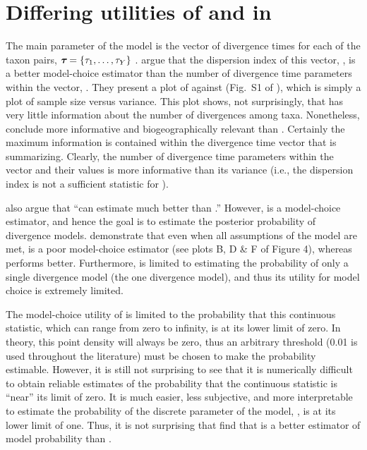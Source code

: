 \section*{Differing utilities of \numt{} and \vmratio{} in \msb}
The main parameter of the \msb model is the vector of divergence
times for each of the taxon pairs,
$\boldsymbol{\tau_{}} = \{\tau_{1}, \ldots, \tau_{Y}\}$
\citep{Oaks2012}.
\citet{Hickerson2013} argue that the dispersion index of this vector,
\vmratio{}, is a better model-choice estimator than the number of 
divergence time parameters within the vector,
\numt{}.
They present a plot of \numt{} against \vmratio{} (Fig.~S1 of
\citet{Hickerson2013}), which is simply a plot of sample size versus variance.
This plot shows, not surprisingly, that \vmratio{} has very little information
about the number of divergences among taxa.
Nonetheless, \citet{Hickerson2013} conclude \vmratio{} more informative and
biogeographically relevant than \numt{}.
Certainly the maximum information is contained within the divergence time
vector that \vmratio{} is summarizing.
Clearly, the number of divergence time parameters within the vector and their
values is more informative than its variance (i.e., the dispersion index is not
a sufficient statistic for \divtvector).

\citet{Hickerson2013} also argue that ``\msb can estimate \vmratio{} much
better than \numt{}.''
However, \msb is a model-choice estimator, and hence the goal is to estimate the
posterior probability of divergence models.
\citet{Oaks2012} demonstrate that even when all assumptions of the model are
met, \vmratio is a poor model-choice estimator (see plots B, D \& F of Figure
4), whereas \numt{} performs better.
Furthermore, \vmratio{} is limited to estimating the probability of only a
single divergence model (the one divergence model), and thus its utility for
model choice is extremely limited.

The model-choice utility of \vmratio{} is limited to the probability that
this continuous statistic, which can range from zero to infinity, is at its lower
limit of zero. In theory, this point density will always be zero, thus an
arbitrary threshold (0.01 is used throughout the \msb literature) must 
be chosen to make the probability estimable.
However, it is still not surprising to see that it is numerically difficult to
obtain reliable estimates of the probability that the continuous \vmratio{}
statistic is ``near'' its limit of zero.
It is much easier, less subjective, and more interpretable to estimate
the probability of the discrete parameter of the model, \numt{}, is
at its lower limit of one.
Thus, it is not surprising that \citet{Oaks2012} find that \numt{} is a better
estimator of model probability than \vmratio{}.


